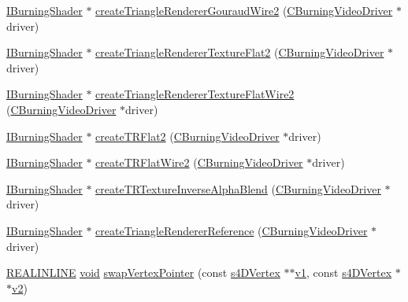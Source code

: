 \begin{DoxyCompactItemize}
\hyperlink{classirr_1_1video_1_1_i_burning_shader}{I\-Burning\-Shader} $\ast$ \hyperlink{namespaceirr_1_1video_ac266251753e2cfeb20fce8496e2d0d76}{create\-Triangle\-Renderer\-Gouraud\-Wire2} (\hyperlink{classirr_1_1video_1_1_c_burning_video_driver}{C\-Burning\-Video\-Driver} $\ast$driver)
\item 
\hyperlink{classirr_1_1video_1_1_i_burning_shader}{I\-Burning\-Shader} $\ast$ \hyperlink{namespaceirr_1_1video_a1bf9c7d9901af61f1fc70ed7a8804289}{create\-Triangle\-Renderer\-Texture\-Flat2} (\hyperlink{classirr_1_1video_1_1_c_burning_video_driver}{C\-Burning\-Video\-Driver} $\ast$driver)
\item 
\hyperlink{classirr_1_1video_1_1_i_burning_shader}{I\-Burning\-Shader} $\ast$ \hyperlink{namespaceirr_1_1video_aa36552dbc369198b7f8e16fc5b87764d}{create\-Triangle\-Renderer\-Texture\-Flat\-Wire2} (\hyperlink{classirr_1_1video_1_1_c_burning_video_driver}{C\-Burning\-Video\-Driver} $\ast$driver)
\item 
\hyperlink{classirr_1_1video_1_1_i_burning_shader}{I\-Burning\-Shader} $\ast$ \hyperlink{namespaceirr_1_1video_a69cd1fe0e612f3c6e6ec8181b8223b32}{create\-T\-R\-Flat2} (\hyperlink{classirr_1_1video_1_1_c_burning_video_driver}{C\-Burning\-Video\-Driver} $\ast$driver)
\item 
\hyperlink{classirr_1_1video_1_1_i_burning_shader}{I\-Burning\-Shader} $\ast$ \hyperlink{namespaceirr_1_1video_a529886300f100f1739db12e938fa99d6}{create\-T\-R\-Flat\-Wire2} (\hyperlink{classirr_1_1video_1_1_c_burning_video_driver}{C\-Burning\-Video\-Driver} $\ast$driver)
\item 
\hyperlink{classirr_1_1video_1_1_i_burning_shader}{I\-Burning\-Shader} $\ast$ \hyperlink{namespaceirr_1_1video_a9720671364e2cfb1ccd458418677f3da}{create\-T\-R\-Texture\-Inverse\-Alpha\-Blend} (\hyperlink{classirr_1_1video_1_1_c_burning_video_driver}{C\-Burning\-Video\-Driver} $\ast$driver)
\item 
\hyperlink{classirr_1_1video_1_1_i_burning_shader}{I\-Burning\-Shader} $\ast$ \hyperlink{namespaceirr_1_1video_ab7c41f07ee8248c0b23dfdb48dbbd4e3}{create\-Triangle\-Renderer\-Reference} (\hyperlink{classirr_1_1video_1_1_c_burning_video_driver}{C\-Burning\-Video\-Driver} $\ast$driver)
\item 
\hyperlink{_software_driver2__compile__config_8h_a3695e51e0a187a6c49684ba3206b0d0a}{R\-E\-A\-L\-I\-N\-L\-I\-N\-E} \hyperlink{wglext_8h_a9e6b7f1933461ef318bb000d6bd13b83}{void} \hyperlink{namespaceirr_1_1video_a06ce2f68d978147fbef6cf5906ee709c}{swap\-Vertex\-Pointer} (const \hyperlink{structirr_1_1video_1_1s4_d_vertex}{s4\-D\-Vertex} $\ast$$\ast$\hyperlink{glext_8h_acaffa8fbe193d1ebac80bcfbe74d337f}{v1}, const \hyperlink{structirr_1_1video_1_1s4_d_vertex}{s4\-D\-Vertex} $\ast$$\ast$\hyperlink{glext_8h_ad75eed9bae3bbcf220d596c3277e8102}{v2})

\end{DoxyCompactItemize}
